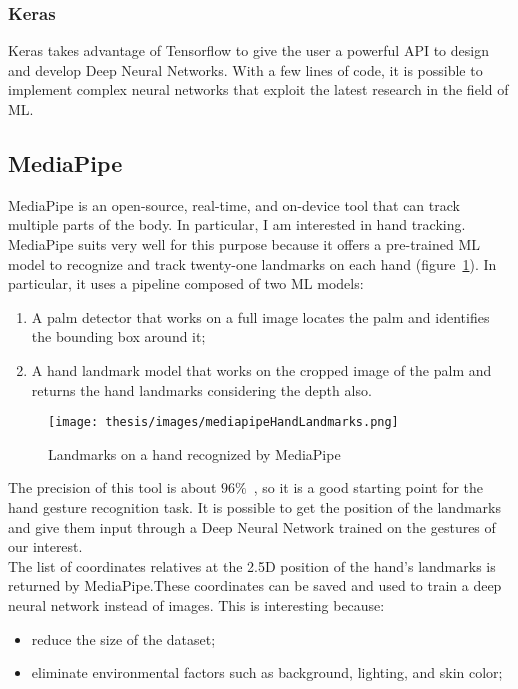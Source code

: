 \documentclass[../thesis.tex]{subfiles}
\begin{document}
\subsubsection{Keras}
Keras takes advantage of Tensorflow to give the user a powerful API to design and develop Deep Neural Networks. With a few lines of code, it is possible to implement complex neural networks that exploit the latest research in the field of  \gls{ML}.

\subsection{MediaPipe}\label{sec:mediapipe}
MediaPipe is an open-source, real-time, and on-device tool that can track multiple parts of the body. In particular, I am interested in hand tracking. MediaPipe suits very well for this purpose because it offers a pre-trained \acrshort{ML} model to recognize and track twenty-one landmarks on each hand (figure~\ref{fig:landmarksMediapipe}). In particular, it uses a pipeline composed of two \acrshort{ML} models:
\begin{enumerate}
    \item A palm detector that works on a full image locates the palm and identifies the bounding box around it;
    \item A hand landmark model that works on the cropped image of the palm and returns the hand landmarks considering the depth also. 
\end{enumerate}
\begin{figure}[H]
    \centering
    \texttt{[image: thesis/images/mediapipeHandLandmarks.png]}
    \caption{Landmarks on a hand recognized by MediaPipe~\cite{site:mediapipe}}
    \label{fig:landmarksMediapipe}
\end{figure}
The precision of this tool is about $96\%$~\cite{paper:mediapipe}, so it is a good starting point for the hand gesture recognition task. It is possible to get the position of the landmarks and give them input through a Deep Neural Network trained on the gestures of our interest. \\
The list of coordinates relatives at the 2.5D position of the hand's landmarks is returned by MediaPipe.These coordinates can be saved and used to train a deep neural network instead of images. This is interesting because: 
\begin{itemize}
    \item reduce the size of the dataset;
    \item eliminate environmental factors such as background, lighting, and skin color;
\end{itemize}
\end{document}

